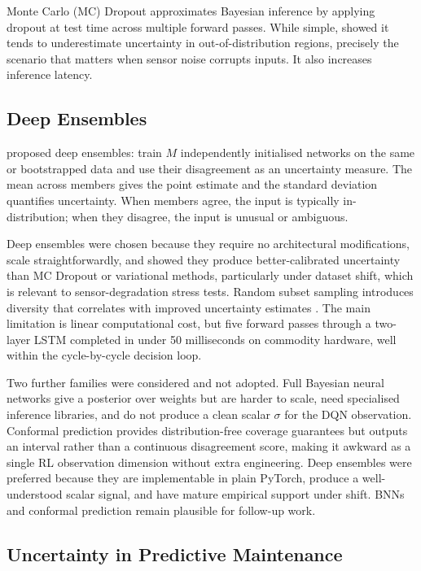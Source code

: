\documentclass[12pt,a4paper]{report}
\begin{document}
Monte Carlo (MC) Dropout \citep{gal2016dropout} approximates Bayesian inference by applying dropout at test time across multiple forward passes. While simple, \citet{osband2016risk} showed it tends to underestimate uncertainty in out-of-distribution regions, precisely the scenario that matters when sensor noise corrupts inputs. It also increases inference latency.

\subsection{Deep Ensembles}

\citet{lakshminarayanan2017simple} proposed deep ensembles: train $M$ independently initialised networks on the same or bootstrapped data and use their disagreement as an uncertainty measure. The mean across members gives the point estimate and the standard deviation quantifies uncertainty. When members agree, the input is typically in-distribution; when they disagree, the input is unusual or ambiguous.


Deep ensembles were chosen because they require no architectural modifications, scale straightforwardly, and \citet{ovadia2019can} showed they produce better-calibrated uncertainty than MC Dropout or variational methods, particularly under dataset shift, which is relevant to sensor-degradation stress tests. Random subset sampling introduces diversity that correlates with improved uncertainty estimates \citep{fort2019deep}. The main limitation is linear computational cost, but five forward passes through a two-layer LSTM completed in under 50 milliseconds on commodity hardware, well within the cycle-by-cycle decision loop.

Two further families were considered and not adopted. Full Bayesian neural networks \citep{neal2012bayesian, blundell2015weight} give a posterior over weights but are harder to scale, need specialised inference libraries, and do not produce a clean scalar $\sigma$ for the DQN observation. Conformal prediction \citep{angelopoulos2021gentle} provides distribution-free coverage guarantees but outputs an interval rather than a continuous disagreement score, making it awkward as a single RL observation dimension without extra engineering. Deep ensembles were preferred because they are implementable in plain PyTorch, produce a well-understood scalar signal, and have mature empirical support under shift. BNNs and conformal prediction remain plausible for follow-up work.

\subsection{Uncertainty in Predictive Maintenance}
\end{document}
